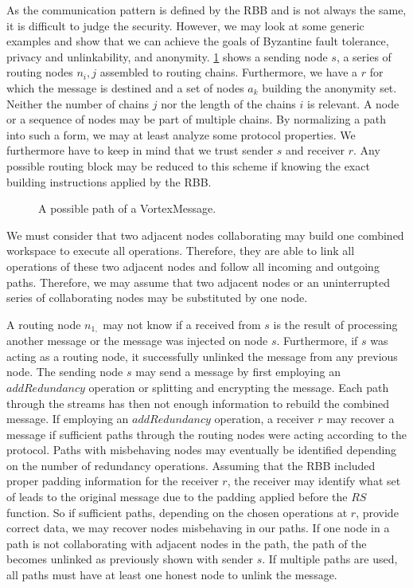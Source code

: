 As the communication pattern is defined by the RBB and is not always the same, it is difficult to judge the security. However, we may look at some generic examples and show that we can achieve the goals of Byzantine fault tolerance, privacy and unlinkability, and anonymity. \cref{fig:messagePaths} shows a sending node $s$, a series of routing nodes $n_i,j$ assembled to routing chains. Furthermore, we have a $r$ for which the message is destined and a set of nodes $a_k$ building the anonymity set. Neither the number of chains $j$ nor the length of the chains $i$ is relevant. A node or a sequence of nodes may be part of multiple chains. By normalizing a path into such a form, we may at least analyze some protocol properties. We furthermore have to keep in mind that we trust sender $s$ and receiver $r$. Any possible routing block may be reduced to this scheme if knowing the exact building instructions applied by the RBB.

\begin{figure}[ht]
	\centering\resizebox{.95\linewidth}{!}{
		
	}
	\caption{A possible path of a VortexMessage.}
	\label{fig:messagePaths}
\end{figure}

We must consider that two adjacent nodes collaborating may build one combined workspace to execute all operations. Therefore, they are able to link all operations of these two adjacent nodes and follow all incoming and outgoing paths. Therefore, we may assume that two adjacent nodes or an uninterrupted series of collaborating nodes may be substituted by one node.

A routing node $n_{1,}$ may not know if a \VortexMessage{} received from $s$ is the result of processing another message or the message was injected on node $s$. Furthermore, if $s$ was acting as a routing node, it successfully unlinked the message from any previous node. The sending node $s$ may send a message by first employing an $addRedundancy$ operation or splitting and encrypting the message. Each path through the streams has then not enough information to rebuild the combined message. If employing an $addRedundancy$ operation, a receiver $r$ may recover a message if sufficient paths through the routing nodes were acting according to the protocol. Paths with misbehaving nodes may eventually be identified depending on the number of redundancy operations. Assuming that the RBB included proper padding information for the receiver $r$, the receiver may identify what set of \VortexMessages leads to the original message due to the padding applied before the $RS$ function. So if sufficient paths, depending on the chosen operations at $r$, provide correct data, we may recover nodes misbehaving in our paths. If one node in a path is not collaborating with adjacent nodes in the path, the path of the \VortexMessage becomes unlinked as previously shown with sender $s$. If multiple paths are used, all paths must have at least one honest node to unlink the message. 

